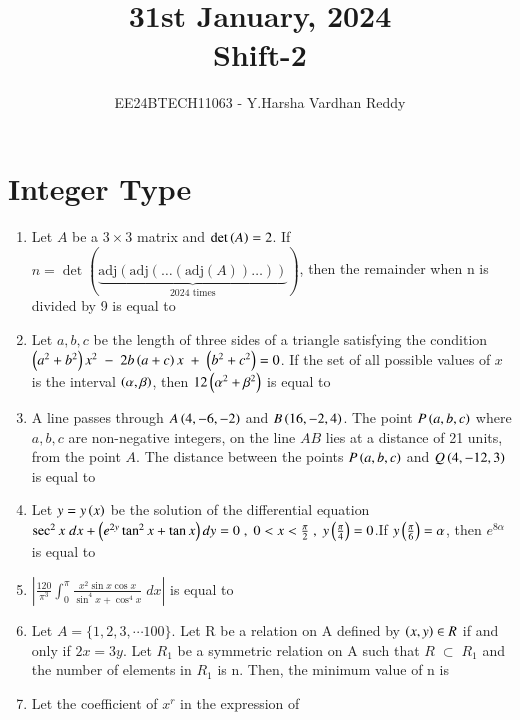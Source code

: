 \documentclass[journal,,12pt,onecolumn]{IEEEtran}
\theoremstyle{remark}
\begin{document}

\vspace{3cm}

\title{31st January, 2024\\Shift-2}
\author{EE24BTECH11063 - Y.Harsha Vardhan Reddy}
\maketitle

\bigskip

\renewcommand{\thefigure}{\theenumi}
\renewcommand{\thetable}{\theenumi}


 \section*{Integer Type}
\begin{enumerate}
    \item Let $A$ be a $3 \times 3$ matrix and $\det\left(A\right)=2$. If $n = \det(\underbrace{\text{adj}(\text{adj}(\dots(\text{adj}(A))\dots))}_{2024 \text{ times}})$, then the remainder when n is divided by 9 is equal to
    \bigskip
    \item Let $a,b,c$ be the length of three sides of a triangle satisfying the condition $\left(a^2+b^2\right)x^2\;-\;2b\left(a+c\right)x\;+\;\left(b^2+c^2\right)=0$. If the set of all possible values of $x$ is the interval $\left(\alpha,\beta\right)$, then $12\left({\alpha}^2+{\beta}^2\right)$ is equal to
\bigskip
    \item A line passes through $A\left(4,-6,-2\right)$ and $B\left(16,-2,4\right)$. The point $P\left(a,b,c\right)$ where $a,b,c$ are non-negative integers, on the line $AB$ lies at a distance of 21 units, from the point $A$. The distance between the points $P\left(a,b,c\right)$ and $Q\left(4,-12,3\right)$ is equal to
    \bigskip
    \item Let $y=y\left(x\right)$ be the solution of the differential equation $\sec^2{x}\;dx+\left(e^{2y}\tan^2{x}+\tan{x}\right)dy=0\;,\;0<x<\frac{\pi}{2}\;,\;y\left(\frac{\pi}{4}\right)=0$.If $y\left(\frac{\pi}{6}\right)=\alpha$, then $e^{8\alpha}$ is equal to
    \bigskip
    \item $\left|\frac{120}{{\pi}^3}\int_{0}^{\pi} \frac{x^2\sin{x}\cos{x}}{\sin^{4}{x}+\cos^{4}{x}}\;dx\right|$ is equal to
    \bigskip
    \item Let $A=\{1,2,3,\cdots100\}$. Let R be a relation on A defined by $\left(x,y\right)\in R$ if and only if $2x=3y$. Let $R_1$ be a symmetric relation on A such that $R\;\subset\;R_1$ and the number of elements in $R_1$ is n. Then, the minimum value of n is
    \bigskip
    \item Let the coefficient of $x^r$ in the expression of\\

\end{enumerate}
\end{document}
